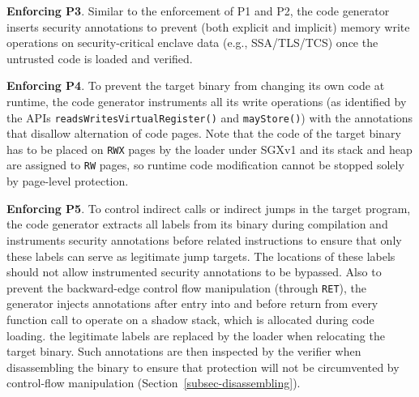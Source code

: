 \vspace{3pt}\noindent\textbf{Enforcing P3}. Similar to the enforcement of P1 and P2, the code generator inserts security annotations to prevent (both explicit and implicit) memory write operations on security-critical enclave data (e.g., SSA/TLS/TCS) once the untrusted code is loaded and verified. 

\vspace{3pt}\noindent\textbf{Enforcing P4}. To prevent the target binary from changing its own code at runtime, the code generator instruments all its write operations (as identified by the APIs \verb|readsWritesVirtualRegister()| and \verb|mayStore()|) with the annotations that disallow alternation of code pages. Note that the code of the target binary has to be placed on \texttt{RWX} pages by the loader under SGXv1 and its stack and heap are assigned to \texttt{RW} pages\DIFdelbegin {}\DIFdelend , so runtime code modification cannot be stopped solely by page-level protection\DIFdelbegin {}\DIFdelend . 


\vspace{3pt}\noindent\textbf{Enforcing P5}. To control indirect calls or indirect jumps in the target program, the code generator extracts all labels from its binary during compilation and instruments security annotations before related instructions to ensure that only these labels can serve as legitimate jump targets. The locations of these labels should not allow \DIFdelbegin {}\DIFdelend instrumented security annotations to be bypassed. 
Also to prevent the backward-edge control flow manipulation (through \texttt{RET}), the generator injects annotations after entry into and before return from every function call to operate on a shadow stack, which is allocated during code loading. \DIFdelbegin {}\DIFdelend \DIFaddbegin {}\DIFaddend the legitimate labels are \DIFaddbegin {}\DIFaddend replaced by the loader when relocating the target binary. Such annotations are then inspected by the verifier when disassembling the binary to ensure that protection will not be circumvented by control-flow manipulation (Section~\ref{subsec-disassembling}).  



